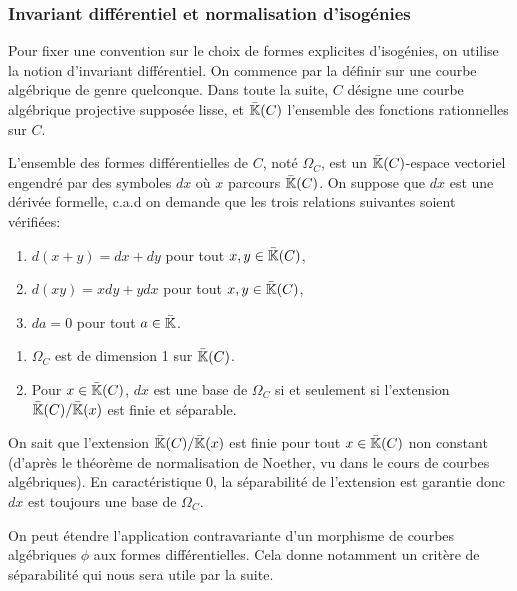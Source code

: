 \subsubsection{Invariant différentiel et normalisation d'isogénies}



Pour fixer une convention sur le choix de formes explicites d'isogénies, on utilise la notion d'invariant différentiel. On commence par la définir sur une courbe algébrique de genre quelconque. Dans toute la suite, $C$ désigne une courbe algébrique projective supposée lisse, et $\bar{\mathbb{K}}(C)$ l'ensemble des fonctions rationnelles sur $C$. 

\begin{Def}
	L'ensemble des formes différentielles de $C$, noté $\Omega_{C}$, est un $\bar{\mathbb{K}}(C)$-espace vectoriel engendré par des symboles $dx$ où $x$ parcours $\bar{\mathbb{K}}(C)$.
	On suppose que $dx$ est une dérivée formelle, c.a.d on demande que les trois relations suivantes soient vérifiées:
	\begin{enumerate}
		\item $d(x+y) = dx + dy$ pour tout $x, y \in\bar{\mathbb{K}}(C)$,
		\item $d(xy) = xdy + ydx$ pour tout $x, y \in\bar{\mathbb{K}}(C)$,
		\item $da = 0$ pour tout $a\in\bar{\mathbb{K}}$.
	\end{enumerate}
\end{Def}

\begin{Prop}
	
	\begin{enumerate}
		\item $\Omega_{C}$ est de dimension 1 sur $\bar{\mathbb{K}}(C)$.
		\item Pour $x \in \bar{\mathbb{K}}(C)$, $dx$ est une base de $\Omega_{C}$ si et seulement si l'extension $\bar{\mathbb{K}}(C) / \bar{\mathbb{K}}(x)$ est finie et séparable. 
	\end{enumerate}
\end{Prop}


\begin{Rem} On sait que l'extension $\bar{\mathbb{K}}(C) / \bar{\mathbb{K}}(x)$ est finie pour tout $x\in\bar{\mathbb{K}}(C)$ non constant (d'après le théorème de normalisation de Noether, vu dans le cours de courbes algébriques). En caractéristique 0, la séparabilité de l'extension est garantie donc $dx$ est toujours une base de $\Omega_{C}$.  
\end{Rem}

On peut étendre l'application contravariante d'un morphisme de courbes algébriques $\phi$ aux formes différentielles. Cela donne notamment un critère de séparabilité qui nous sera utile par la suite.

